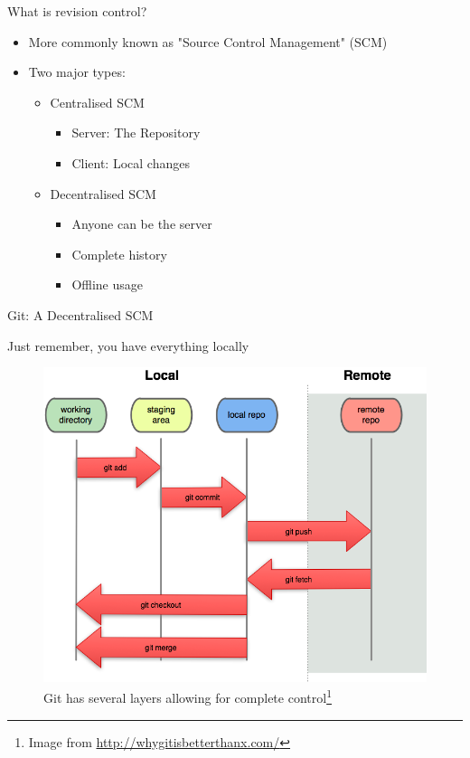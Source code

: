 \documentclass{beamer}
\begin{document}
\begin{frame}{What is revision control?}
    \begin{itemize}
        \item More commonly known as "Source Control Management" (SCM)
        \pause
        \item Two major types:
        \begin{itemize}
            \item Centralised SCM
            \begin{itemize}
                \item Server: The Repository
                \item Client: Local changes
            \end{itemize}
            \pause
            \item Decentralised SCM
            \begin{itemize}
                \item Anyone can be the server %
                \item Complete history
                \item Offline usage
            \end{itemize}
        \end{itemize}  
    \end{itemize}  
\end{frame}

\begin{frame}{Git: A Decentralised SCM}
    \begin{block}{Just remember, you have everything locally}
    \begin{figure}[ht]
        \centering
        \includegraphics[width=0.6\linewidth]{img/overview.png}
        \caption{Git has several layers allowing for complete control\footnote{Image from \href{http://whygitisbetterthanx.com/}{http://whygitisbetterthanx.com/}}}
        \label{fig:figure0}
    \end{figure}
    \end{block}
\end{frame}
\end{document}
